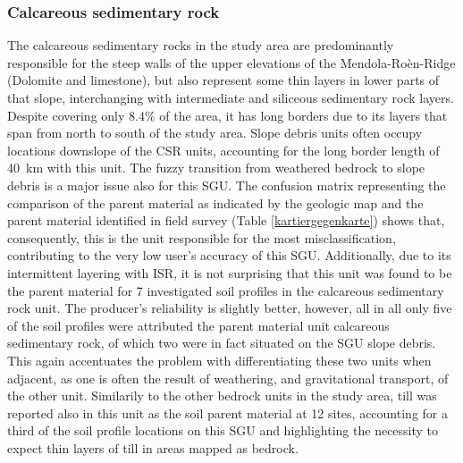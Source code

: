 \documentclass[preprint,12pt,authoryear]{elsarticle}
\begin{document}
\subsubsection{Calcareous sedimentary rock}
The calcareous sedimentary rocks in the study area are predominantly  responsible for the steep walls of the upper elevations of the  Mendola-Ro\`en-Ridge (Dolomite and limestone), but also represent some thin layers in lower parts of that slope, interchanging with intermediate and siliceous sedimentary rock layers. Despite covering only 8.4\% of the area, it has long borders due to its layers that span from north to south of the study area. Slope debris units often occupy locations downslope of the CSR units, accounting for the long  border length of 40~km with this unit. The fuzzy transition from weathered bedrock to slope debris is a major issue also for this SGU. The confusion matrix representing the comparison of the parent material as indicated by the geologic map and the parent material identified in field survey (Table \ref{kartiergegenkarte}) shows that, consequently, this is the unit responsible for the most misclassification, contributing to the very low user's accuracy of this SGU. Additionally, due to its intermittent layering with ISR, it is not surprising that this unit was found to be the parent material for 7 investigated soil profiles in the calcareous sedimentary rock unit. The producer's reliability is slightly better, however, all in all only five of the soil profiles were attributed the parent material unit calcareous sedimentary rock, of which two were in fact situated on the SGU slope debris. This again accentuates the problem with differentiating these two units when adjacent, as one is often the result of weathering, and gravitational transport, of the other unit. Similarily to the other bedrock units in the study area, till was reported also in this unit as the soil parent material at 12 sites, accounting for a third of the soil profile locations on this SGU and highlighting the necessity to expect thin layers of till in areas mapped as bedrock. 
\end{document}
